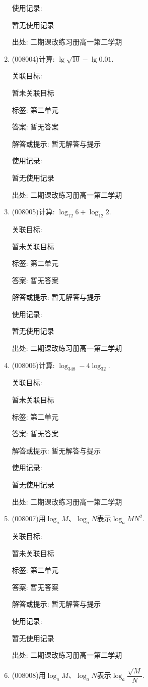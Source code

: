 \documentclass[10pt,a4paper]{article}
\begin{document}
\begin{enumerate}[1.]
使用记录:

暂无使用记录


出处: 二期课改练习册高一第二学期
\item { (008004)}计算: $\lg \sqrt {10}-\lg 0.01$.


关联目标:

暂未关联目标



标签: 第二单元

答案: 暂无答案

解答或提示: 暂无解答与提示

使用记录:

暂无使用记录


出处: 二期课改练习册高一第二学期
\item { (008005)}计算: $\log _{12}6+\log _{12}2$.


关联目标:

暂未关联目标



标签: 第二单元

答案: 暂无答案

解答或提示: 暂无解答与提示

使用记录:

暂无使用记录


出处: 二期课改练习册高一第二学期
\item { (008006)}计算: $\log _348-4\log _32$.


关联目标:

暂未关联目标



标签: 第二单元

答案: 暂无答案

解答或提示: 暂无解答与提示

使用记录:

暂无使用记录


出处: 二期课改练习册高一第二学期
\item { (008007)}用$\log _aM$、$\log _aN$表示$\log _aMN^2$.


关联目标:

暂未关联目标



标签: 第二单元

答案: 暂无答案

解答或提示: 暂无解答与提示

使用记录:

暂无使用记录


出处: 二期课改练习册高一第二学期
\item { (008008)}用$\log _aM$、$\log _aN$表示$\log _a\dfrac{\sqrt M}N$.



\end{enumerate}
\end{document}
